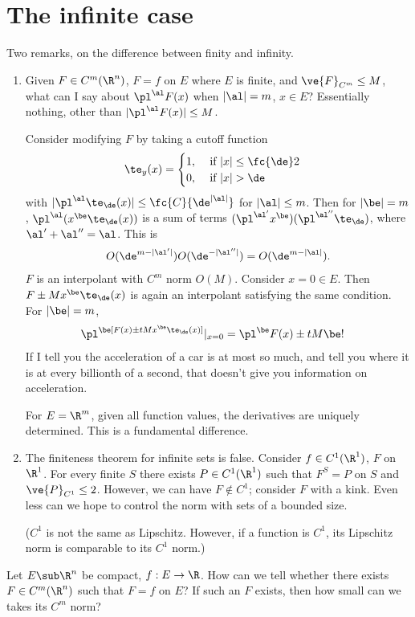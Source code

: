 
\section{The infinite case}

Two remarks, on the difference between finity and infinity.
\begin{enumerate}
\item
Given $F\in C^m(\R^n)$, $F=f$ on $E$ where $E$ is finite, and $\ve{F}_{C^m}\le M$, what can I say about $\pl^\al F(x)$ when $|\al|=m$, $x\in E$? Essentially nothing, other than $|\pl^\al F(x)|\le M$.

Consider modifying $F$ by taking a cutoff function 
\begin{align}
\te_y(x) &= \begin{cases}
1,&\text{ if }|x|\le \fc{\de}2\\
0,&\text{ if }|x|>\de
\end{cases}
\end{align}
with $|\pl^\al \te_\de(x)|\le \fc{C}{\de^{|\al|}}$ for $|\al|\le m$. Then for $|\be|=m$, $\pl^\al(x^\be \te_\de(x))$ is a sum of terms $(\pl^{\al'} x^\be) (\pl^{\al''}\te_\de)$, where $\al'+\al''=\al$. This is
\begin{align}
O(\de^{m-|\al'|})O(\de^{-|\al''|}) = O(\de^{m-|\al|}). 
\end{align}
$F$ is an interpolant with $C^m$ norm $O(M)$.
Consider $x=0\in E$.  Then $F\pm Mx^\be \te_\de(x)$ is again an interpolant satisfying the same condition.  For $|\be|=m$, 
\begin{align}
\pl^\be[F(x) \pm t Mx^\be \te_\de(x)]|_{x=0}
&
=\pl^\be F(x) \pm tM\be !
\end{align}
If I tell you the acceleration of a car is at most so much, and tell you where it is at every billionth of a second, that doesn't give you information on acceleration.

For  $E=\R^m$, given all function values, the derivatives are uniquely determined. This is a fundamental difference.
\item
The finiteness theorem for infinite sets is false. Consider $f\in C^1(\R^1)$, $F$ on $\R^1$. For every finite $S$ there exists $P\in C^1(\R^1)$ such that $F^S=P$ on $S$ and $\ve{P}_{C^1}\le 2$. However, we can have $F\nin C^1$; consider $F$ with a kink. %
Even less can we hope to control the norm with sets of a bounded size.

($C^1$ is not the same as Lipschitz. However, if a function is $C^1$, its Lipschitz norm is comparable to its $C^1$ norm.)
\end{enumerate}
Let $E\sub \R^n$ be compact, $f:E\to \R$. How can we tell whether there exists $F\in C^m(\R^n)$ such that $F=f$ on $E$? If such an $F$ exists, then how small can we takes its $C^m$ norm?

